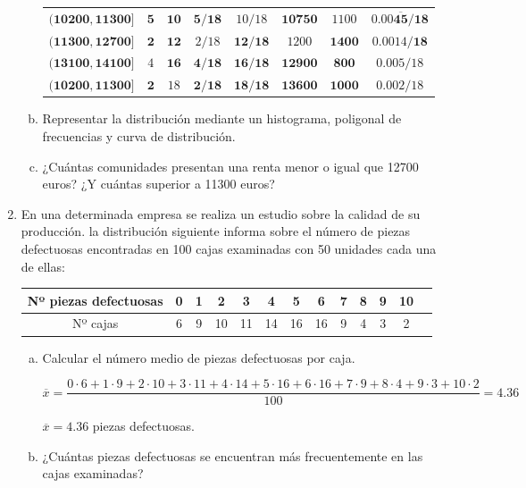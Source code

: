 \documentclass[]{article}
\begin{document}
\begin{enumerate}[{Ejercicio} 1.]
\begin{enumerate}[a)]
\begin{center}
\begin{tabular}{| r | c | c | c | c | c | c | c |}
						$\mathbf{(10200, 11300]}$& $\mathbf{5}$ &$\mathbf{10}$ & $\mathbf{5/18}$ & $10/18$& $\mathbf{10750}$& $1100$& $\mathbf{0.00\overline{45}/18}$ \\
						$\mathbf{(11300, 12700]}$& $\mathbf{2}$&$\mathbf{12}$& $2/18$ & $\mathbf{12/18}$ & $1200$ & $\mathbf{1400}$& $\mathbf{0.0014/18}$ \\
						$\mathbf{(13100, 14100]}$& $4$ & $\mathbf{16}$ &$\mathbf{4/18}$ & $\mathbf{16/18}$& $\mathbf{12900}$& $\mathbf{800}$& $0.005/18$ \\
						$\mathbf{(10200, 11300]}$& $\mathbf{2}$ &$18$ & $\mathbf{2/18}$& $\mathbf{18/18}$& $\mathbf{13600}$&$\mathbf{1000}$ &  $0.002/18$ \\
						\hline
					\end{tabular}
				\end{center}
			\item Representar la distribución mediante un histograma, poligonal de frecuencias y curva de distribución.
			\item ¿Cuántas comunidades presentan una renta menor o igual que 12700 euros? ¿Y cuántas superior a 11300 euros?
		\end{enumerate}
	
		\item En una determinada empresa se realiza un estudio sobre la calidad de su producción. la distribución siguiente informa sobre el número de piezas defectuosas encontradas en 100 cajas examinadas con 50 unidades cada una de ellas:
		
		\begin{center}
			\begin{tabular}{| c | c | c | c | c | c | c | c | c | c | c | c | c |}
				\hline
				Nº piezas defectuosas & 0 & 1 & 2 & 3 & 4 & 5 & 6 & 7 & 8 & 9 & 10 \\
				\hline
				Nº cajas & 6 & 9 & 10 & 11 & 14 & 16 & 16 & 9 & 4 & 3 & 2 \\
				\hline
			\end{tabular}
			\begin{enumerate} [a)]
				\item Calcular el número medio de piezas defectuosas por caja.
				
				$$ \overline{x} = \dfrac{0 \cdot 6 + 1 \cdot 9 + 2 \cdot 10 + 3 \cdot 11 + 4 \cdot 14 + 5 \cdot 16 + 6 \cdot 16 + 7 \cdot 9 + 8 \cdot 4 + 9 \cdot 3 + 10 \cdot 2}{100} = 4.36 $$
				
				$\overline{x} = 4.36$ piezas defectuosas.
				
				\item ¿Cuántas piezas defectuosas se encuentran más frecuentemente en las cajas examinadas? \newline
				

\end{enumerate}
\end{center}
\end{enumerate}
\end{document}

